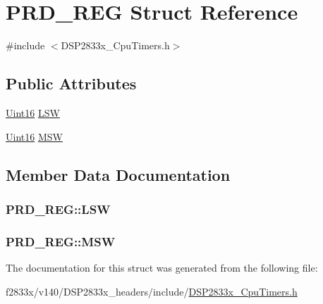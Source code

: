 \hypertarget{struct_p_r_d___r_e_g}{}\section{P\+R\+D\+\_\+\+R\+E\+G Struct Reference}
\label{struct_p_r_d___r_e_g}


{\ttfamily \#include $<$D\+S\+P2833x\+\_\+\+Cpu\+Timers.\+h$>$}

\subsection*{Public Attributes}
\begin{DoxyCompactItemize}
\item 
\hyperlink{_d_s_p2833x___device_8h_a59a9f6be4562c327cbfb4f7e8e18f08b}{Uint16} \hyperlink{struct_p_r_d___r_e_g_adfb2b8a236fd03fb575ea4d59b7cb4ca}{L\+S\+W}
\item 
\hyperlink{_d_s_p2833x___device_8h_a59a9f6be4562c327cbfb4f7e8e18f08b}{Uint16} \hyperlink{struct_p_r_d___r_e_g_ad90fc902b6d702eac43f9ca53a131a6a}{M\+S\+W}
\end{DoxyCompactItemize}


\subsection{Member Data Documentation}
\hypertarget{struct_p_r_d___r_e_g_adfb2b8a236fd03fb575ea4d59b7cb4ca}{}
\subsubsection[{L\+S\+W}]{ P\+R\+D\+\_\+\+R\+E\+G\+::\+L\+S\+W}\label{struct_p_r_d___r_e_g_adfb2b8a236fd03fb575ea4d59b7cb4ca}
\hypertarget{struct_p_r_d___r_e_g_ad90fc902b6d702eac43f9ca53a131a6a}{}
\subsubsection[{M\+S\+W}]{ P\+R\+D\+\_\+\+R\+E\+G\+::\+M\+S\+W}\label{struct_p_r_d___r_e_g_ad90fc902b6d702eac43f9ca53a131a6a}


The documentation for this struct was generated from the following file\+:\begin{DoxyCompactItemize}
\item 
f2833x/v140/\+D\+S\+P2833x\+\_\+headers/include/\hyperlink{_d_s_p2833x___cpu_timers_8h}{D\+S\+P2833x\+\_\+\+Cpu\+Timers.\+h}\end{DoxyCompactItemize}
